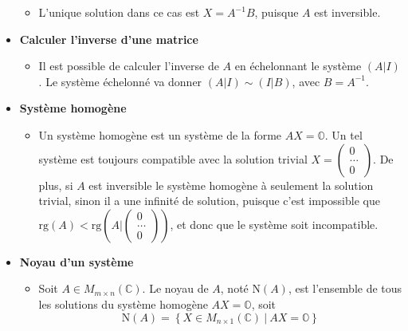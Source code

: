 \begin{itemize}
\begin{itemize}
\begin{equation*}
                    \end{equation*}
              \item[] L'unique solution dans ce cas est $X = A^{-1}B$, puisque $A$ est inversible.
          \end{itemize}
    \item[] \textbf{Calculer l'inverse d'une matrice} \begin{itemize}
              \item[] Il est possible de calculer l'inverse de $A$ en échelonnant le système $(A|I)$. Le
                    système échelonné va donner $(A|I) \sim (I|B)$, avec $B = A^{-1}$.
          \end{itemize}
    \item[] \textbf{Système homogène} \begin{itemize}
              \item[] Un système homogène est un système de la forme $AX = \mathbb{O}$. Un tel système
                    est toujours compatible avec la solution trivial $X = \left(\begin{smallmatrix}
                                0 \\
                                \ldots \\
                                0
                            \end{smallmatrix}\right)$. De plus, si $A$ est inversible le système
                    homogène à seulement la solution trivial, sinon il a une infinité de
                    solution, puisque c'est impossible que $\text{rg}(A) < \text{rg}(A|\left(\begin{smallmatrix}
                                0 \\
                                \ldots \\
                                0
                            \end{smallmatrix}\right))$, et donc que le système soit incompatible.
          \end{itemize}
    \item[] \textbf{Noyau d'un système} \begin{itemize}
              \item[] Soit $A \in M_{m \times n}(\mathbb{C})$. Le noyau de $A$, noté $\text{N}(A)$, est l'ensemble de tous les solutions du système homogène 
            $AX = \mathbb{O}$, soit \begin{equation*}
                        \text{N}(A) = \left\{ X \in M_{n \times 1}(\mathbb{C}) \ | \ AX = \mathbb{O}  \right\}
                    \end{equation*}
          \end{itemize}
\end{itemize}